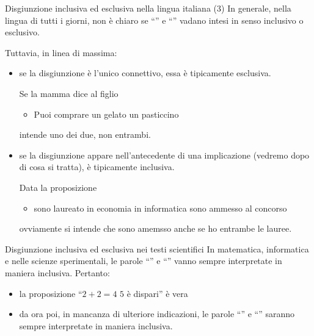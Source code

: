 \documentclass[10pt,dvipsnames,handout]{beamer}
\begin{document}
\begin{frame}{Disgiunzione inclusiva ed esclusiva nella lingua italiana (3)}
    In generale, nella lingua di tutti i giorni, non è chiaro se ``''  e ``'' vadano intesi in senso inclusivo o esclusivo.

    \medskip
    Tuttavia, in linea di massima:
    \begin{itemize}
        \item se la disgiunzione è l'unico connettivo, essa è tipicamente esclusiva.

        \medskip
        Se la mamma dice al figlio
        \begin{itemize}
            \item Puoi comprare un gelato  un pasticcino
        \end{itemize}
        intende uno dei due, non entrambi.

        \pause
        \item se la disgiunzione appare nell'antecedente di una implicazione (vedremo dopo di cosa si tratta), è tipicamente inclusiva.

            \medskip
        Data la proposizione
        \begin{itemize}
            \item {} sono laureato in economia  in informatica sono ammesso al concorso
        \end{itemize}
        ovviamente si intende che sono amemsso anche se ho entrambe le lauree.
    \end{itemize}
\end{frame}

\begin{frame}{Disgiunzione inclusiva ed esclusiva nei testi scientifici}
    In matematica, informatica e nelle scienze sperimentali, le parole ``'' e ``'' vanno sempre interpretate in maniera inclusiva. Pertanto:
    \begin{itemize}
        \item la proposizione ``$2 + 2 = 4$  $5$ è dispari'' è vera
        \item da ora poi, in mancanza di ulteriore indicazioni, le parole ``'' e ``'' saranno sempre interpretate in maniera inclusiva.
    \end{itemize}
\end{frame}

\end{document}
